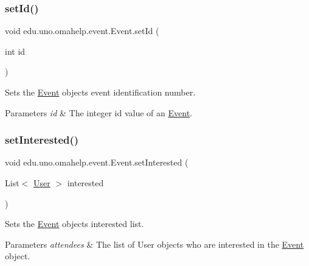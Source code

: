 \subsubsection{\texorpdfstring{set\+Id()}{setId()}}
{\footnotesize\ttfamily void edu.\+uno.\+omahelp.\+event.\+Event.\+set\+Id (\begin{DoxyParamCaption}\item[{int}]{id }\end{DoxyParamCaption})}

Sets the \mbox{\hyperlink{classedu_1_1uno_1_1omahelp_1_1event_1_1_event}{Event}} object\textquotesingle{}s event identification number.


\begin{DoxyParams}{Parameters}
{\em id} & The integer id value of an \mbox{\hyperlink{classedu_1_1uno_1_1omahelp_1_1event_1_1_event}{Event}}. \\
\hline
\end{DoxyParams}
\mbox{\label{classedu_1_1uno_1_1omahelp_1_1event_1_1_event_a117deb1e116c337bbd4236e33c6911d0}} 
\subsubsection{\texorpdfstring{set\+Interested()}{setInterested()}}
{\footnotesize\ttfamily void edu.\+uno.\+omahelp.\+event.\+Event.\+set\+Interested (\begin{DoxyParamCaption}\item[{List$<$ \mbox{\hyperlink{classedu_1_1uno_1_1omahelp_1_1user_1_1_user}{User}} $>$}]{interested }\end{DoxyParamCaption})}

Sets the \mbox{\hyperlink{classedu_1_1uno_1_1omahelp_1_1event_1_1_event}{Event}} object\textquotesingle{}s interested list.


\begin{DoxyParams}{Parameters}
{\em attendees} & The list of User objects who are interested in the \mbox{\hyperlink{classedu_1_1uno_1_1omahelp_1_1event_1_1_event}{Event}} object. \\
\hline
\end{DoxyParams}
\mbox{\label{classedu_1_1uno_1_1omahelp_1_1event_1_1_event_a32c47b2f1a63f116ba2b3ee164c0920c}} 
